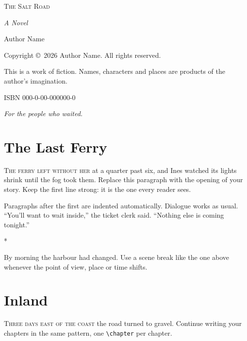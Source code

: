 \documentclass[11pt,openany]{book}
\newcommand{\scenebreak}{\par\medskip\begin{center}*\quad*\quad*\end{center}\medskip\noindent}
\newcommand{\opening}[1]{\noindent\textsc{#1}}
\begin{document}
\frontmatter
\thispagestyle{empty}
\begin{center}
\vspace*{1.8in}
{\Huge\scshape The Salt Road\par}
\vspace{0.3in}
{\large\itshape A Novel\par}
\vfill
{\large Author Name\par}
\vspace{0.5in}
\end{center}

\clearpage
\thispagestyle{empty}
\vspace*{\fill}
{\small\noindent Copyright \copyright\ 2026 Author Name. All rights reserved.\par
\medskip\noindent This is a work of fiction. Names, characters and places are products of the author's imagination.\par
\medskip\noindent ISBN 000-0-00-000000-0\par}

\clearpage
\thispagestyle{empty}
\vspace*{2in}
\begin{center}\itshape For the people who waited.\end{center}

\mainmatter

\chapter{The Last Ferry}
\opening{The ferry left without her} at a quarter past six, and Ines watched its lights shrink until the fog took them. Replace this paragraph with the opening of your story. Keep the first line strong: it is the one every reader sees.

Paragraphs after the first are indented automatically. Dialogue works as usual.
``You'll want to wait inside,'' the ticket clerk said. ``Nothing else is coming tonight.''

\scenebreak
By morning the harbour had changed. Use a scene break like the one above whenever the point of view, place or time shifts.

\chapter{Inland}
\opening{Three days east of the coast} the road turned to gravel. Continue writing your chapters in the same pattern, one \verb|\chapter| per chapter.
\end{document}
